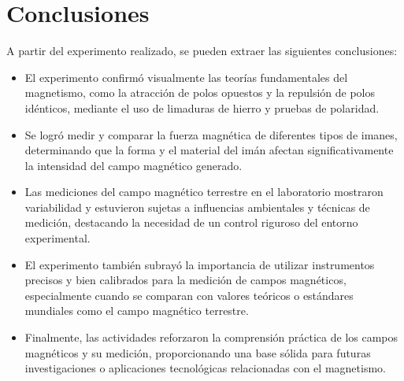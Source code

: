 \section{Conclusiones}
A partir del experimento realizado, se pueden extraer las siguientes conclusiones:
\begin{itemize}
    \item El experimento confirmó visualmente las teorías fundamentales del magnetismo, como la atracción de polos opuestos y la repulsión de polos idénticos, mediante el uso de limaduras de hierro y pruebas de polaridad.
    \item Se logró medir y comparar la fuerza magnética de diferentes tipos de imanes, determinando que la forma y el material del imán afectan significativamente la intensidad del campo magnético generado.
    \item Las mediciones del campo magnético terrestre en el laboratorio mostraron variabilidad y estuvieron sujetas a influencias ambientales y técnicas de medición, destacando la necesidad de un control riguroso del entorno experimental.
    \item El experimento también subrayó la importancia de utilizar instrumentos precisos y bien calibrados para la medición de campos magnéticos, especialmente cuando se comparan con valores teóricos o estándares mundiales como el campo magnético terrestre.
    \item Finalmente, las actividades reforzaron la comprensión práctica de los campos magnéticos y su medición, proporcionando una base sólida para futuras investigaciones o aplicaciones tecnológicas relacionadas con el magnetismo.
\end{itemize}